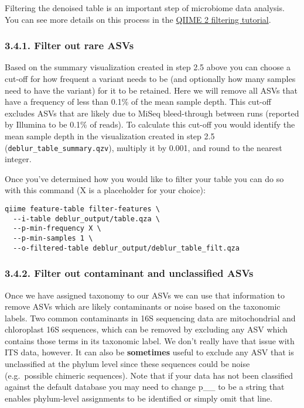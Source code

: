 \documentclass[
]{book}
\begin{document}
Filtering the denoised table is an important step of microbiome data analysis. You can see more details on this process in the \href{https://docs.qiime2.org/2022.11/tutorials/filtering/}{QIIME 2 filtering tutorial}.

\subsubsection{3.4.1. Filter out rare ASVs}\label{filter-out-rare-asvs-2}

Based on the summary visualization created in step 2.5 above you can choose a cut-off for how frequent a variant needs to be (and optionally how many samples need to have the variant) for it to be retained. Here we will remove all ASVs that have a frequency of less than 0.1\% of the mean sample depth. This cut-off excludes ASVs that are likely due to MiSeq bleed-through between runs (reported by Illumina to be 0.1\% of reads). To calculate this cut-off you would identify the mean sample depth in the visualization created in step 2.5 (\texttt{deblur\_table\_summary.qzv}), multiply it by 0.001, and round to the nearest integer.

Once you've determined how you would like to filter your table you can do so with this command (X is a placeholder for your choice):

\begin{verbatim}
qiime feature-table filter-features \
  --i-table deblur_output/table.qza \
  --p-min-frequency X \
  --p-min-samples 1 \
  --o-filtered-table deblur_output/deblur_table_filt.qza
\end{verbatim}

\subsubsection{3.4.2. Filter out contaminant and unclassified ASVs}\label{filter-out-contaminant-and-unclassified-asvs-2}

Once we have assigned taxonomy to our ASVs we can use that information to remove ASVs which are likely contaminants or noise based on the taxonomic labels. Two common contaminants in 16S sequencing data are mitochondrial and chloroplast 16S sequences, which can be removed by excluding any ASV which contains those terms in its taxonomic label. We don't really have that issue with ITS data, however. It can also be \textbf{sometimes} useful to exclude any ASV that is unclassified at the phylum level since these sequences could be noise (e.g.~possible chimeric sequences). Note that if your data has not been classified against the default database you may need to change p\_\_ to be a string that enables phylum-level assignments to be identified or simply omit that line.
\end{document}
